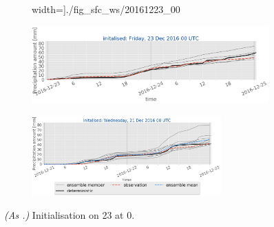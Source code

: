 \begin{figure}[H]
\begin{subfigure}[b]{0.9\textwidth}
		width=\textwidth]{./fig_sfc_ws/20161223_00}
		\caption{}\label{fig:res:sfc_ws23}
	\end{subfigure}
	\begin{subfigure}[b]{0.9\textwidth}
		\includegraphics[trim={0.cm 1.5cm 0cm 0cm},clip,
		width=\textwidth]{./fig_sfc_precip/20161223_00}
		\caption{}\label{fig:res:sfc_precip23}
	\end{subfigure}
	\begin{subfigure}[b]{\textwidth}
		\centering
		\includegraphics[trim={5.5cm 0cm 5.cm 17.7cm},clip,
		width=0.8\textwidth]{./fig_sfc_precip/20161221_00_label}
	\end{subfigure}
	\caption{\textit{(As .)} Initialisation on \SI{23}{\dec} at \SI{0}{\UTC}. }\label{fig:obs_meps:23}
\end{figure}
